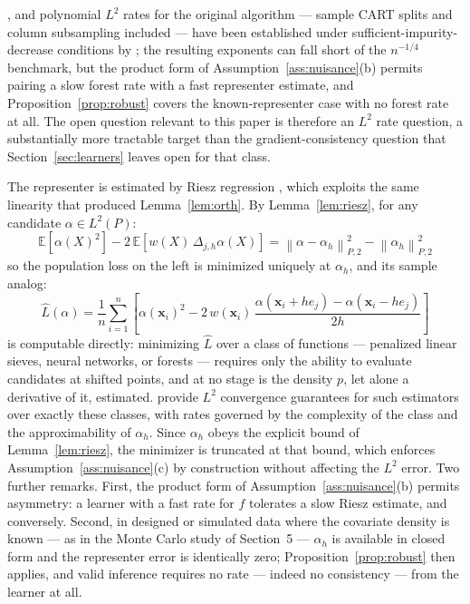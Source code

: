 \documentclass[12pt]{article}
\newcommand{\norm}[1]{\left\| #1 \right\|}
\newcommand{\E}{\mathbb{E}}
\newcommand{\Dh}{\Delta_{j,h}}
\newcommand{\Ptwo}[1]{\norm{#1}_{P,2}}
\begin{document}
	\citep{scornet2015forests}, and polynomial $L^2$ rates for the original
	algorithm --- sample CART splits and column subsampling included --- have been
	established under sufficient-impurity-decrease conditions by
	\citet{chi2022forests}; the resulting exponents can fall short of the
	$n^{-1/4}$ benchmark, but the product form of
	Assumption~\ref{ass:nuisance}(b) permits pairing a slow forest rate with a fast
	representer estimate, and Proposition~\ref{prop:robust} covers the
	known-representer case with no forest rate at all. The open question relevant to
	this paper is therefore an $L^2$ rate question, a substantially more tractable
	target than the gradient-consistency question that
	Section~\ref{sec:learners} leaves open for that class.
	
	The representer is estimated by Riesz regression
	\citep{chernozhukov2022riesz}, which exploits the same linearity that produced
	Lemma~\ref{lem:orth}. By Lemma~\ref{lem:riesz}, for any candidate
	$\alpha \in L^2(P)$:
	\begin{equation}
		\E\left[\alpha(X)^2\right] - 2\,\E\left[w(X)\, \Dh \alpha(X)\right]
		= \Ptwo{\alpha - \alpha_h}^2 - \Ptwo{\alpha_h}^2
		\label{eq:rieszloss}
	\end{equation}
	so the population loss on the left is minimized uniquely at $\alpha_h$, and its
	sample analog:
	\begin{equation}
		\hat{L}(\alpha) = \frac{1}{n} \sum_{i=1}^{n} \left[
		\alpha(\mathbf{x}_i)^2
		- 2\, w(\mathbf{x}_i)\,
		\frac{\alpha(\mathbf{x}_i + h e_j) - \alpha(\mathbf{x}_i - h e_j)}{2h}
		\right]
	\end{equation}
	is computable directly: minimizing $\hat{L}$ over a class of functions ---
	penalized linear sieves, neural networks, or forests --- requires only the ability
	to evaluate candidates at shifted points, and at no stage is the density $p$, let
	alone a derivative of it, estimated. \citet{chernozhukov2022riesz} provide
	$L^2$ convergence guarantees for such estimators over exactly these classes, with
	rates governed by the complexity of the class and the approximability of
	$\alpha_h$. Since $\alpha_h$ obeys the explicit bound of Lemma~\ref{lem:riesz},
	the minimizer is truncated at that bound, which enforces
	Assumption~\ref{ass:nuisance}(c) by construction without affecting the $L^2$
	error. Two further remarks. First, the product form of
	Assumption~\ref{ass:nuisance}(b) permits asymmetry: a learner with a fast rate
	for $f$ tolerates a slow Riesz estimate, and conversely. Second, in designed or
	simulated data where the covariate density is known --- as in the Monte Carlo
	study of Section~5 --- $\alpha_h$ is available in closed form and the representer
	error is identically zero; Proposition~\ref{prop:robust} then applies, and valid
	inference requires no rate --- indeed no consistency --- from the learner at all.
	
\end{document}
